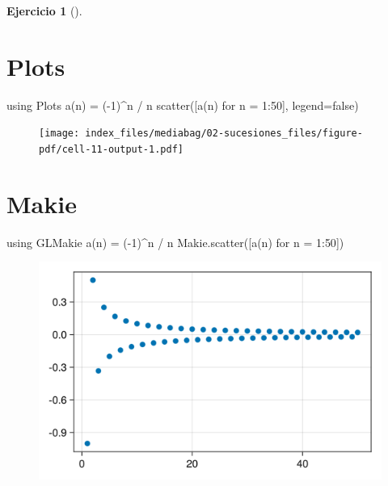 \documentclass[
  a4paper,
]{scrreport}
\newenvironment{Shaded}{\begin{snugshade}}{\end{snugshade}}
\newcommand{\BuiltInTok}[1]{\textcolor[rgb]{0.00,0.23,0.31}{#1}}
\newcommand{\ConstantTok}[1]{\textcolor[rgb]{0.56,0.35,0.01}{#1}}
\newcommand{\FloatTok}[1]{\textcolor[rgb]{0.68,0.00,0.00}{#1}}
\newcommand{\FunctionTok}[1]{\textcolor[rgb]{0.28,0.35,0.67}{#1}}
\newcommand{\ImportTok}[1]{\textcolor[rgb]{0.00,0.46,0.62}{#1}}
\newcommand{\NormalTok}[1]{\textcolor[rgb]{0.00,0.23,0.31}{#1}}
\newcommand{\OperatorTok}[1]{\textcolor[rgb]{0.37,0.37,0.37}{#1}}
\theoremstyle{definition}
\newtheorem{exercise}{Ejercicio}[chapter]
\theoremstyle{remark}
\begin{document}
\begin{exercise}[]
\begin{tcolorbox}
\section{Plots}

\begin{Shaded}
\begin{Highlighting}[]
\ImportTok{using} \BuiltInTok{Plots}
\FunctionTok{a}\NormalTok{(n) }\OperatorTok{=}\NormalTok{ (}\OperatorTok{{-}}\FloatTok{1}\NormalTok{)}\OperatorTok{\^{}}\NormalTok{n }\OperatorTok{/}\NormalTok{ n}
\FunctionTok{scatter}\NormalTok{([}\FunctionTok{a}\NormalTok{(n) for n }\OperatorTok{=} \FloatTok{1}\OperatorTok{:}\FloatTok{50}\NormalTok{], legend}\OperatorTok{=}\ConstantTok{false}\NormalTok{)}
\end{Highlighting}
\end{Shaded}

\begin{figure}[H]

{\centering \texttt{[image: index\_files/mediabag/02-sucesiones\_files/figure-pdf/cell-11-output-1.pdf]}

}

\end{figure}

\section{Makie}

\begin{Shaded}
\begin{Highlighting}[]
\ImportTok{using} \BuiltInTok{GLMakie}
\FunctionTok{a}\NormalTok{(n) }\OperatorTok{=}\NormalTok{ (}\OperatorTok{{-}}\FloatTok{1}\NormalTok{)}\OperatorTok{\^{}}\NormalTok{n }\OperatorTok{/}\NormalTok{ n}
\NormalTok{Makie.}\FunctionTok{scatter}\NormalTok{([}\FunctionTok{a}\NormalTok{(n) for n }\OperatorTok{=} \FloatTok{1}\OperatorTok{:}\FloatTok{50}\NormalTok{])}
\end{Highlighting}
\end{Shaded}

\begin{figure}[H]

{\centering \includegraphics{02-sucesiones_files/figure-pdf/cell-12-output-1.png}

}
\end{figure}
\end{tcolorbox}
\end{exercise}
\end{document}
